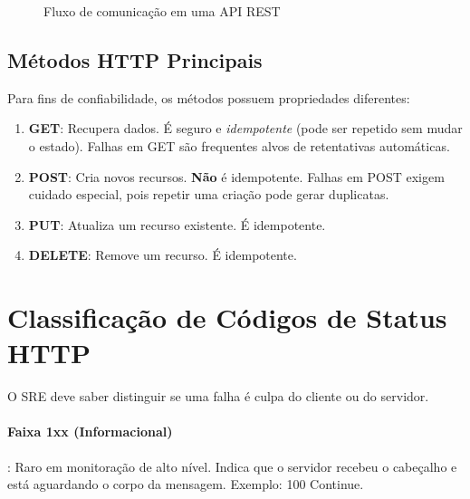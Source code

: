 \documentclass[12pt,a4paper,twoside]{report}
\begin{document}
\begin{figure}[h]
    \centering
    \caption{Fluxo de comunicação em uma API REST}
    \label{fig:api-flow}
\end{figure}

\subsection{Métodos HTTP Principais}

Para fins de confiabilidade, os métodos possuem propriedades diferentes:

\begin{enumerate}
    \item \textbf{GET}: Recupera dados. É seguro e \textit{idempotente} (pode ser repetido sem mudar o estado). Falhas em GET são frequentes alvos de retentativas automáticas.
    \item \textbf{POST}: Cria novos recursos. \textbf{Não} é idempotente. Falhas em POST exigem cuidado especial, pois repetir uma criação pode gerar duplicatas.
    \item \textbf{PUT}: Atualiza um recurso existente. É idempotente.
    \item \textbf{DELETE}: Remove um recurso. É idempotente.
\end{enumerate}

\section{Classificação de Códigos de Status HTTP}

O SRE deve saber distinguir se uma falha é culpa do cliente ou do servidor.

\paragraph{Faixa 1xx (Informacional)}: Raro em monitoração de alto nível. Indica que o servidor recebeu o cabeçalho e está aguardando o corpo da mensagem. Exemplo: 100 Continue.
\end{document}
